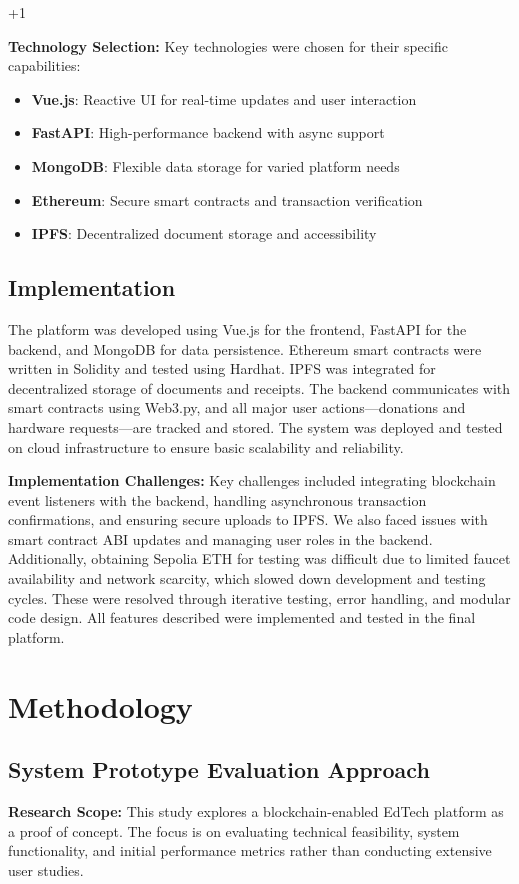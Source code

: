 +1\documentclass[conference]{IEEEtran}
\begin{document}
\textbf{Technology Selection:}
Key technologies were chosen for their specific capabilities:
\begin{itemize}
    \item \textbf{Vue.js}: Reactive UI for real-time updates and user interaction
    \item \textbf{FastAPI}: High-performance backend with async support
    \item \textbf{MongoDB}: Flexible data storage for varied platform needs
    \item \textbf{Ethereum}: Secure smart contracts and transaction verification
    \item \textbf{IPFS}: Decentralized document storage and accessibility
\end{itemize}

\subsection{Implementation}
The platform was developed using Vue.js for the frontend, FastAPI for the backend, and MongoDB for data persistence. Ethereum smart contracts were written in Solidity and tested using Hardhat. IPFS was integrated for decentralized storage of documents and receipts. The backend communicates with smart contracts using Web3.py, and all major user actions—donations and hardware requests—are tracked and stored. The system was deployed and tested on cloud infrastructure to ensure basic scalability and reliability.

\textbf{Implementation Challenges:}
Key challenges included integrating blockchain event listeners with the backend, handling asynchronous transaction confirmations, and ensuring secure uploads to IPFS. We also faced issues with smart contract ABI updates and managing user roles in the backend. Additionally, obtaining Sepolia ETH for testing was difficult due to limited faucet availability and network scarcity, which slowed down development and testing cycles. These were resolved through iterative testing, error handling, and modular code design. All features described were implemented and tested in the final platform.

\section{Methodology}
\subsection{System Prototype Evaluation Approach}
\textbf{Research Scope:} This study explores a blockchain-enabled EdTech platform as a proof of concept. The focus is on evaluating technical feasibility, system functionality, and initial performance metrics rather than conducting extensive user studies.
\end{document}

